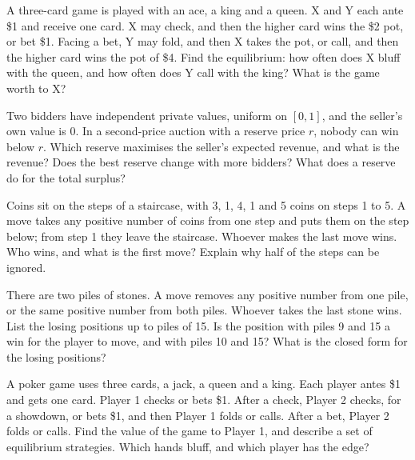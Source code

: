 \begin{question}\label{iq:iv1:games:15}
A three-card game is played with an ace, a king and a queen. X and Y each ante \$1 and receive one card. X may check, and then the higher card wins the \$2 pot, or bet \$1. Facing a bet, Y may fold, and then X takes the pot, or call, and then the higher card wins the pot of \$4. Find the equilibrium: how often does X bluff with the queen, and how often does Y call with the king? What is the game worth to X?
\end{question}

\begin{question}\label{iq:iv1:games:16}
Two bidders have independent private values, uniform on $[0, 1]$, and the seller's own value is 0. In a second-price auction with a reserve price $r$, nobody can win below $r$. Which reserve maximises the seller's expected revenue, and what is the revenue? Does the best reserve change with more bidders? What does a reserve do for the total surplus?
\end{question}

\begin{question}\label{iq:iv1:games:17}
Coins sit on the steps of a staircase, with 3, 1, 4, 1 and 5 coins on steps 1 to 5. A move takes any positive number of coins from one step and puts them on the step below; from step 1 they leave the staircase. Whoever makes the last move wins. Who wins, and what is the first move? Explain why half of the steps can be ignored.
\end{question}

\begin{question}\label{iq:iv1:games:18}
There are two piles of stones. A move removes any positive number from one pile, or the same positive number from both piles. Whoever takes the last stone wins. List the losing positions up to piles of 15. Is the position with piles 9 and 15 a win for the player to move, and with piles 10 and 15? What is the closed form for the losing positions?
\end{question}

\begin{question}\label{iq:iv1:games:19}
A poker game uses three cards, a jack, a queen and a king. Each player antes \$1 and gets one card. Player 1 checks or bets \$1. After a check, Player 2 checks, for a showdown, or bets \$1, and then Player 1 folds or calls. After a bet, Player 2 folds or calls. Find the value of the game to Player 1, and describe a set of equilibrium strategies. Which hands bluff, and which player has the edge?
\end{question}

